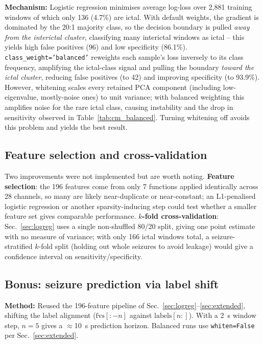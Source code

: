 ﻿\documentclass[a4paper,10pt]{article}
\begin{document}
\textbf{Mechanism:} Logistic regression minimises average log-loss over 2{,}881 training windows of which only 136 (4.7\%) are ictal. With default weights, the gradient is dominated by the 20:1 majority class, so the decision boundary is pulled \emph{away from the interictal cluster}, classifying many interictal windows as ictal -- this yields high false positives (96) and low specificity (86.1\%). \texttt{class\_weight='balanced'} reweights each sample's loss inversely to its class frequency, amplifying the ictal-class signal and pulling the boundary \emph{toward the ictal cluster}, reducing false positives (to 42) and improving specificity (to 93.9\%). However, whitening scales every retained PCA component (including low-eigenvalue, mostly-noise ones) to unit variance; with balanced weighting this amplifies noise for the rare ictal class, causing instability and the drop in sensitivity observed in Table~\ref{tab:cm_balanced}. Turning whitening off avoids this problem and yields the best result.

\subsection{Feature selection and cross-validation}
\label{sec:featsel-cv}

Two improvements were not implemented but are worth noting. \textbf{Feature selection}: the 196 features come from only 7 functions applied identically across 28 channels, so many are likely near-duplicate or near-constant; an L1-penalised logistic regression or another sparsity-inducing step could test whether a smaller feature set gives comparable performance. \textbf{$k$-fold cross-validation}: Sec.~\ref{sec:logreg} uses a single non-shuffled 80/20 split, giving one point estimate with no measure of variance; with only 166 ictal windows total, a seizure-stratified $k$-fold split (holding out whole seizures to avoid leakage) would give a confidence interval on sensitivity/specificity.

\subsection{Bonus: seizure prediction via label shift}
\label{sec:predictor}

\textbf{Method:} Reused the 196-feature pipeline of Sec.~\ref{sec:logreg}--\ref{sec:extended}, shifting the label alignment ($\mathrm{fvs}[{:}{-}n]$ against $\mathrm{labels}[n{:}]$). With a 2~s window step, $n=5$ gives a $\approx$10~s prediction horizon. Balanced runs use \texttt{whiten=False} per Sec.~\ref{sec:extended}.
\end{document}

